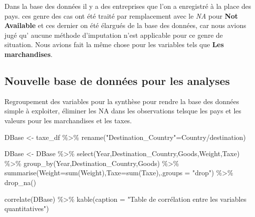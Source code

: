\documentclass[
]{book}
\newenvironment{Shaded}{\begin{snugshade}}{\end{snugshade}}
\newcommand{\AttributeTok}[1]{\textcolor[rgb]{0.77,0.63,0.00}{#1}}
\newcommand{\FunctionTok}[1]{\textcolor[rgb]{0.00,0.00,0.00}{#1}}
\newcommand{\NormalTok}[1]{#1}
\newcommand{\OtherTok}[1]{\textcolor[rgb]{0.56,0.35,0.01}{#1}}
\newcommand{\SpecialCharTok}[1]{\textcolor[rgb]{0.00,0.00,0.00}{#1}}
\newcommand{\StringTok}[1]{\textcolor[rgb]{0.31,0.60,0.02}{#1}}
\begin{document}
Dans la base des données il y a des entreprises que l'on a enregistré à la place des pays. ces genre des cas ont été traité par remplacement avec le \emph{NA} pour \textbf{Not Available} et ces dernier on été élargués de la base des données, car nous avions jugé qu' aucune méthode d'imputation n'est applicable pour ce genre de situation. Nous avions fait la même chose pour les variables tels que \textbf{Les marchandises}.

\hypertarget{nouvelle-base-de-donnuxe9es-pour-les-analyses}{%
\subsection{Nouvelle base de données pour les analyses}\label{nouvelle-base-de-donnuxe9es-pour-les-analyses}}

Regroupement des variables pour la synthèse pour rendre la base des données simple à exploiter, éliminer les NA dans les observations telsque les pays et les valeurs pour les marchandises et les taxes.

\begin{Shaded}
\begin{Highlighting}[]
\NormalTok{DBase }\OtherTok{\textless{}{-}}\NormalTok{ taxe\_df }\SpecialCharTok{\%\textgreater{}\%} \FunctionTok{rename}\NormalTok{(}\StringTok{"Destination\_Country"}\OtherTok{=}\StringTok{\textasciigrave{}}\AttributeTok{Country/destination}\StringTok{\textasciigrave{}}\NormalTok{)}


\NormalTok{DBase }\OtherTok{\textless{}{-}}\NormalTok{ DBase  }\SpecialCharTok{\%\textgreater{}\%} 
  \FunctionTok{select}\NormalTok{(Year,Destination\_Country,Goods,Weight,Taxe) }\SpecialCharTok{\%\textgreater{}\%} 
  \FunctionTok{group\_by}\NormalTok{(Year,Destination\_Country,Goods) }\SpecialCharTok{\%\textgreater{}\%} 
  \FunctionTok{summarise}\NormalTok{(}\AttributeTok{Weight=}\FunctionTok{sum}\NormalTok{(Weight),}\AttributeTok{Taxe=}\FunctionTok{sum}\NormalTok{(Taxe),}\AttributeTok{.groups =} \StringTok{"drop"}\NormalTok{) }\SpecialCharTok{\%\textgreater{}\%} \FunctionTok{drop\_na}\NormalTok{() }

\FunctionTok{correlate}\NormalTok{(DBase) }\SpecialCharTok{\%\textgreater{}\%} \FunctionTok{kable}\NormalTok{(}\AttributeTok{caption =} \StringTok{"Table de corrélation entre les variables quantitatives"}\NormalTok{)}
\end{Highlighting}
\end{Shaded}
\end{document}
